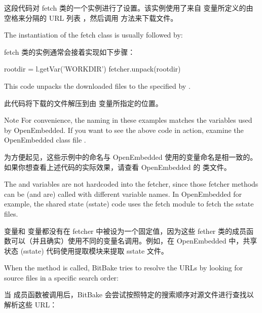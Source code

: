 这段代码对 fetch 类的一个实例进行了设置。该实例使用了来自  变量所定义的由空格来分隔的 URL 列表 ，然后调用  方法来下载文件。

The instantiation of the fetch class is usually followed by:

fetch 类的实例通常会接着实现如下步骤：

\begin{pyglist}
rootdir = l.getVar('WORKDIR')
fetcher.unpack(rootdir)
\end{pyglist}

This code unpacks the downloaded files to the specified by .

此代码将下载的文件解压到由  变量所指定的位置。

\medskip
\begin{noteblock}{Note}%
For convenience, the naming in these examples matches the variables used by OpenEmbedded. If you want to see the above code in action, examine the OpenEmbedded class file .

\medskip
为方便起见，这些示例中的命名与 OpenEmbedded 使用的变量命名是相一致的。如果你想查看上述代码的实际效果，请查看 OpenEmbedded 的  类文件。
\end{noteblock}

The  and  variables are not hardcoded into the fetcher, since those fetcher methods can be (and are) called with different variable names. In OpenEmbedded for example, the shared state (sstate) code uses the fetch module to fetch the sstate files.

 变量和  变量都没有在 fetcher 中被设为一个固定值，因为这些 fether 类的成员函数可以（并且确实）使用不同的变量名调用。例如，在 OpenEmbedded 中，共享状态 (sstate) 代码使用提取模块来提取 sstate 文件。

When the  method is called, BitBake tries to resolve the URLs by looking for source files in a specific search order:

当  成员函数被调用后，BitBake 会尝试按照特定的搜索顺序对源文件进行查找以解析这些 URL：

